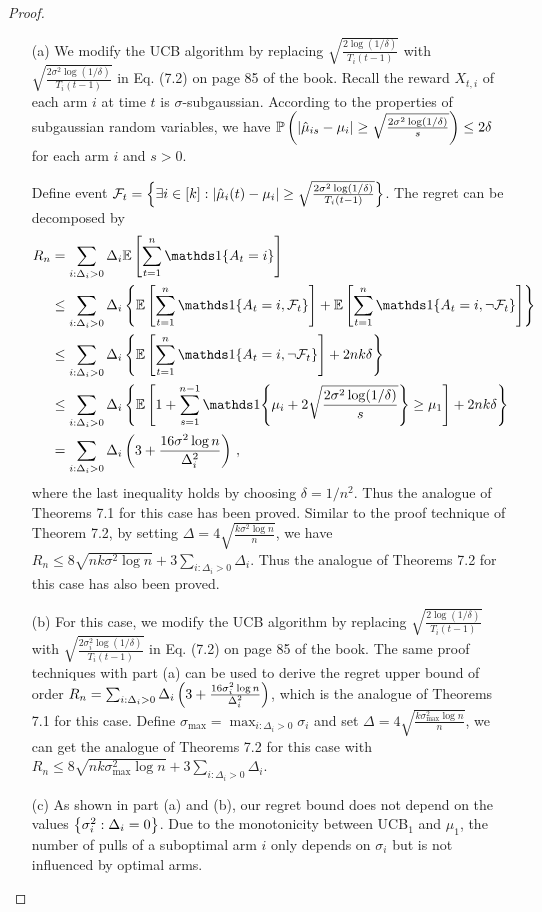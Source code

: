 \begin{proof}
\begin{enumerate}
    \item[(a)] We modify the UCB algorithm by replacing $\sqrt{\frac{2\log (1/\delta)}{T_i(t-1)}}$ with $\sqrt{\frac{2\sigma^2 \log (1/\delta)}{T_i(t-1)}}$ in Eq. (7.2) on page 85 of the book. 
    Recall the reward $X_{t,i}$ of each arm $i$ at time $t$ is $\sigma$-subgaussian. According to the properties of subgaussian random variables, we have $\mathbb{P} \left(\left| \hat{\mu}_{is} - \mu_i  \right|\ge \sqrt{\frac{2\sigma^2 \log (1/\delta)}{s}} \right) \le 2\delta$ for each arm $i$ and $s>0$. 

    Define event $\mathcal{F}_t = \left\{ \exists i \in [k]: \left| \hat{\mu}_{i}(t) - \mu_i  \right|\ge \sqrt{\frac{2\sigma^2 \log (1/\delta)}{T_i(t-1)}} \right\}$. 
    The regret can be decomposed by
    \begin{align*}
        R_n &= \sum_{i:\Delta_i>0}\Delta_i \EE{ \sum_{t=1}^n \bOne{A_t = i} } \\
        &\le \sum_{i:\Delta_i>0}\Delta_i \set{ \EE{ \sum_{t=1}^n \bOne{A_t = i, \cF_t} } +  \EE{ \sum_{t=1}^n \bOne{A_t = i, \neg \cF_t} } } \\
        &\le \sum_{i:\Delta_i>0}\Delta_i \set{ \EE{ \sum_{t=1}^n \bOne{A_t = i, \neg \cF_t} } +  2nk\delta }\\
        &\le \sum_{i:\Delta_i>0}\Delta_i \set{ \EE{ 1+ \sum_{s=1}^{n-1} \bOne{ \mu_i + 2\sqrt{\frac{2\sigma^2 \log (1/\delta)}{s}} } \ge \mu_1 }  +  2nk\delta } \\
        &= \sum_{i:\Delta_i>0}\Delta_i \bracket{ 3 + \frac{16\sigma^2 \log n}{\Delta_i^2}} \,,
    \end{align*}
    where the last inequality holds by choosing $\delta=1/n^2$.  Thus the analogue of Theorems 7.1 for this case has been proved. Similar to the proof technique of Theorem 7.2, by setting $\Delta = 4\sqrt{\frac{k\sigma^2 \log n}{n}}$, we have $R_n \le 8\sqrt{nk\sigma^2 \log n} + 3\sum_{i:\Delta_i >0} \Delta_i$. Thus the analogue of Theorems 7.2 for this case has also been proved. 

    \item[(b)] For this case, we modify the UCB algorithm by replacing $\sqrt{\frac{2\log (1/\delta)}{T_i(t-1)}}$ with $\sqrt{\frac{2\sigma_i^2 \log (1/\delta)}{T_i(t-1)}}$ in Eq. (7.2) on page 85 of the book. The same proof techniques with part (a) can be used to derive the regret upper bound of order $R_n = \sum_{i:\Delta_i>0}\Delta_i \left( 3 + \frac{16\sigma_i^2 \log n}{\Delta_i^2}\right)$, which is the analogue of Theorems 7.1 for this case. Define $\sigma_{\max} = \max_{i:\Delta_i>0}\sigma_i$ and set $\Delta = 4\sqrt{\frac{k\sigma_{\max}^2 \log n}{n}}$, we can get the analogue of Theorems 7.2 for this case with $R_n \le 8\sqrt{nk\sigma_{\max}^2 \log n} + 3\sum_{i:\Delta_i >0} \Delta_i$.

    \item[(c)] As shown in part (a) and (b), our regret bound does not depend on the values $\left\{ \sigma_i^2:\Delta_i=0 \right\}$. Due to the monotonicity between UCB$_1$ and $\mu_1$, the number of pulls of a suboptimal arm $i$ only depends on $\sigma_i$ but is not influenced by optimal arms. 
\end{enumerate}
\end{proof}

